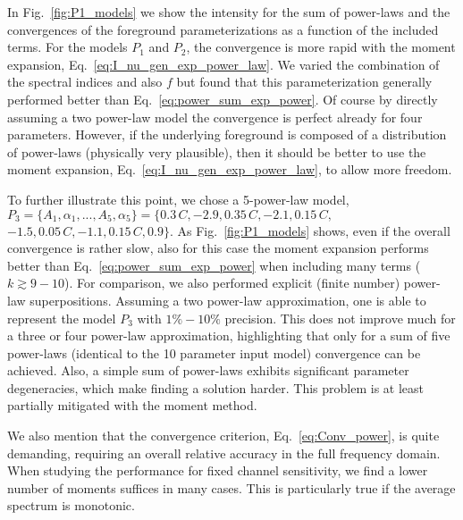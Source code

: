 \documentclass[usenatbib]{mn2e}
\begin{document}
In Fig.~\ref{fig:P1_models} we show the intensity for the sum of power-laws and the convergences of the foreground parameterizations as a function of the included terms. For the models $P_1$ and $P_2$, the convergence is more rapid with the moment expansion, Eq.~\eqref{eq:I_nu_gen_exp_power_law}. We varied the combination of the spectral indices and also $f$ but found that this parameterization generally performed better than Eq.~\eqref{eq:power_sum_exp_power}. Of course by directly assuming a two power-law model the convergence is perfect already for four parameters. However, if the underlying foreground is composed of a distribution of power-laws (physically very plausible), then it should be better to use the moment expansion, Eq.~\eqref{eq:I_nu_gen_exp_power_law}, to allow more freedom. 

To further illustrate this point, we chose a 5-power-law model, $P_3=\{A_1, \alpha_1, ..., A_5, \alpha_5\}=\{0.3\,C, -2.9, 0.35\,C, -2.1, 0.15\,C,$ $ -1.5, 0.05\,C, -1.1, 0.15\,C, 0.9\}$. As Fig.~\ref{fig:P1_models} shows, even if the overall convergence is rather slow, also for this case the moment expansion performs better than Eq.~\eqref{eq:power_sum_exp_power} when including many terms ($k\gtrsim 9-10$). 
%
For comparison, we also performed explicit (finite number) power-law superpositions. Assuming a two power-law approximation, one is able to represent the model $P_3$ with $1\%-10\%$ precision. This does not improve much for a three or four power-law approximation, highlighting that only for a sum of five power-laws (identical to the 10 parameter input model) convergence can be achieved. Also, a simple sum of power-laws exhibits significant parameter degeneracies, which make finding a solution harder. This problem is at least partially mitigated with the moment method.

We also mention that the convergence criterion, Eq.~\eqref{eq:Conv_power}, is quite demanding, requiring an overall relative accuracy in the full frequency domain. When studying the performance for fixed channel sensitivity, we find a lower number of moments suffices in many cases. This is particularly true if the average spectrum is monotonic.
\end{document}
